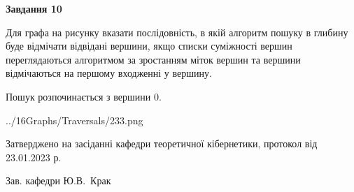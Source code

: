 \documentclass[12pt, ukrainian]{article}
\begin{document}
{\begin {large}
{\begin {center}\textbf{Завдання 10}\end {center}}\par
Для графа на рисунку вказати послідовність, в якій алгоритм пошуку в глибину буде відмічати відвідані вершини, якщо списки суміжності вершин переглядаються алгоритмом за зростанням міток вершин та вершини відмічаються на першому вход\-женні у вершину.\par
Пошук розпочинається з вершини 0.\par

\begin{center}
	{../16Graphs/Traversals/233.png}
\end{center}\par
\newpage


\end {large}
}
{\smallskip \begin {small} Затверджено на засіданні кафедри теоретичної кібернетики, протокол  від   23.01.2023 р.\par\smallskip\smallskip
{\parbox {6.5 cm}{Зав. кафедри \dotfill Ю.В.~Крак}} \end{small}}
\end{document}
